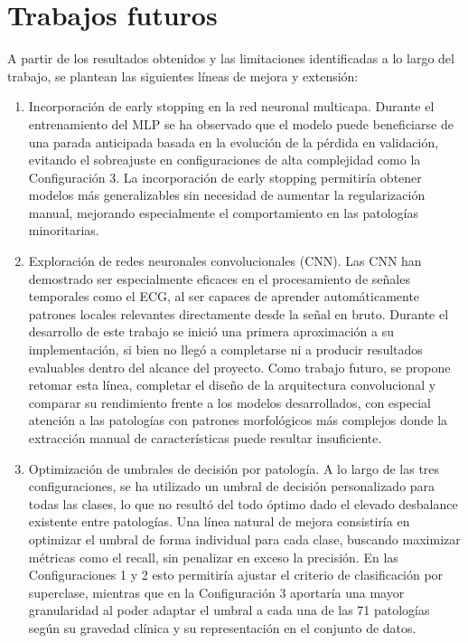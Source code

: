 \documentclass[12pt,a4paper,twoside]{book}
\begin{document}
\section{Trabajos futuros}

A partir de los resultados obtenidos y las limitaciones identificadas a lo largo del trabajo, se plantean las siguientes líneas de mejora y extensión:

\begin{enumerate}
	\item Incorporación de early stopping en la red neuronal multicapa. 
	Durante el entrenamiento del MLP se ha observado que el modelo puede beneficiarse de una parada anticipada basada en la evolución de la pérdida en validación, evitando el sobreajuste en configuraciones de alta complejidad como la Configuración 3. 
	La incorporación de early stopping permitiría obtener modelos más generalizables sin necesidad de aumentar la regularización manual, mejorando especialmente el comportamiento en las patologías minoritarias.
	\item  Exploración de redes neuronales convolucionales (CNN). 
	Las CNN han demostrado ser especialmente eficaces en el procesamiento de señales temporales como el ECG, al ser capaces de aprender automáticamente patrones locales relevantes directamente desde la señal en bruto. 
	Durante el desarrollo de este trabajo se inició una primera aproximación a su implementación, si bien no llegó a completarse ni a producir resultados evaluables dentro del alcance del proyecto. 
	Como trabajo futuro, se propone retomar esta línea, completar el diseño de la arquitectura convolucional y comparar su rendimiento frente a los modelos desarrollados, con especial atención a las patologías con patrones morfológicos más complejos donde la extracción manual de características puede resultar insuficiente.
	\item Optimización de umbrales de decisión por patología. 
	A lo largo de las tres configuraciones, se ha utilizado un umbral de decisión personalizado para todas las clases, lo que no resultó del todo óptimo dado el elevado desbalance existente entre patologías. 
	Una línea natural de mejora consistiría en optimizar el umbral de forma individual para cada clase, buscando maximizar métricas como el recall, sin penalizar en exceso la precisión. 
	En las Configuraciones 1 y 2 esto permitiría ajustar el criterio de clasificación por superclase, mientras que en la Configuración 3 aportaría una mayor granularidad al poder adaptar el umbral a cada una de las 71 patologías según su gravedad clínica y su representación en el conjunto de datos.

\end{enumerate}
\end{document}
